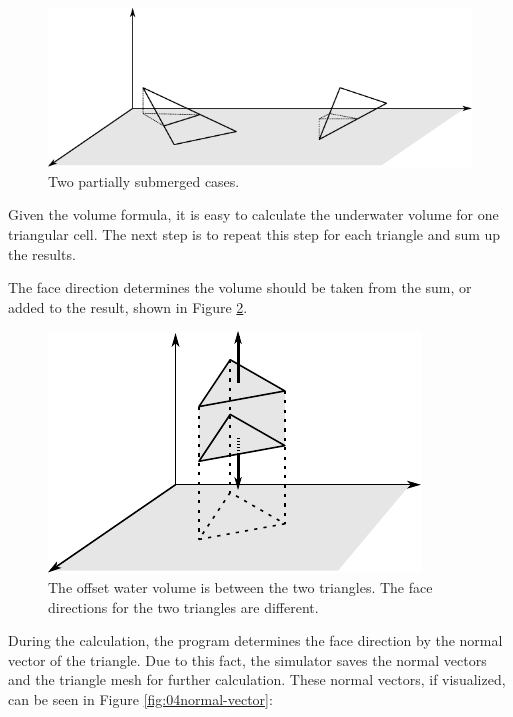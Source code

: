 \begin{figure}[ht]
    \centering
    \includegraphics[width=.8\textwidth]{images/04two-cases.pdf}
    \caption{Two partially submerged cases.}
    \label{fig:04two-cases}
\end{figure}

Given the volume formula, it is easy to calculate the underwater volume for one triangular cell. The next step is to repeat this step for each triangle and sum up the results.

The face direction determines the volume should be taken from the sum, or added to the result, shown in Figure \ref{fig:04face-direction}. 

\begin{figure}[ht]
    \centering
    \includegraphics[width=.6\textwidth]{images/04face-direction.pdf}
    \caption{The offset water volume is between the two triangles. The face directions for the two triangles are different.}
    \label{fig:04face-direction}
\end{figure}

During the calculation, the program determines the face direction by the normal vector of the triangle. Due to this fact, the simulator saves the normal vectors and the triangle mesh for further calculation. These normal vectors, if visualized, can be seen in Figure \ref{fig:04normal-vector}:

